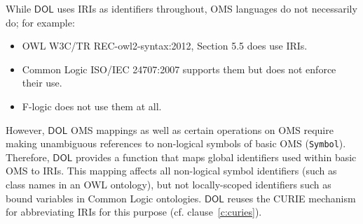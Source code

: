 \documentclass[10pt,fleqn,final]{scrreprt}
\makeatletter
\newcommand*{\cf}{cf.\@\xspace}
\newcommand*\CommentAuthor{}
\renewcommand*\CommentAuthor{#1}}
\newcommand*\CommentDate{}
\renewcommand*\CommentDate{#1}}
\newcommand*\CommentId{}
\renewcommand*\CommentId{#1}}
\newcommand*\CommentType{}
\renewcommand*\CommentType{#1}}
\newcommand*{\SetCommentColorByType}[1]{%
\edef\localType{{#1}}%
\expandafter\ifstrequal\localType{q-aut}{\colorlet{CommentColor}{red}}{%
\expandafter\ifstrequal\localType{q-all}{\colorlet{CommentColor}{orange}}{%
\expandafter\ifstrequal\localType{todo}{\colorlet{CommentColor}{orange}}{%
\expandafter\ifstrequal\localType{fyi}{\colorlet{CommentColor}{lightgray}}{%
\colorlet{CommentColor}{yellow}}}}}}
\newcommand*{\SetCommentPrefixByType}[1]{%
\edef\localType{{#1}}%
\expandafter\@ifmtarg\localType{%
\edef\CommentPrefix{}%
}{%
\caseupper[q]{#1}%
\edef\CommentPrefix{\thestring: }%
}}
\newcommand*{\initComment}[1]{%
\setkeys{Comment}{#1}%
\SetCommentColorByType{\CommentType}%
\relax%
\SetCommentPrefixByType{\CommentType}%
\relax%
}
\newcommand*{\todonote}[2][]{%
\initComment{#1}%
\pdfcomment[author=\CommentAuthor,color=CommentColor,date=\CommentDate,id=\CommentId]{%
\CommentPrefix
#2}}
\renewcommand*{\todonote}[2][]{%
\initComment{#1}%
\ednote{\CommentPrefix #2}}
\newcommand*{\CLnote}[2][author=Christoph Lange]{%
\todonote[author=Christoph Lange,#1]{#2} 
}
\newcommand*{\syntax}[1]{\texttt{#1}}
\newcommand*{\DOL}{\ensuremath{\mathsf{DOL}}\xspace}
\newcommand{\clauserefname}{clause}
\newcommand{\cref}[1]{\clauserefname~\ref{#1}}
\newcommand{\nisref}[1]{#1}
\newenvironment{definitions}[0]{\medskip }{}
\makeatother
\begin{document}
\begin{definitions}
While \DOL uses IRIs as identifiers throughout, OMS languages do not necessarily do; for example:
\begin{itemize}
\item OWL \nisref{W3C/TR REC-owl2-syntax:2012, Section 5.5} does use IRIs.
\item Common Logic \nisref{ISO/IEC 24707:2007} supports them but does not enforce their use.
\item F-logic \cite{flogic} does not use them at all.
\end{itemize}
However, \DOL OMS mappings as well as 
certain operations on OMS require making unambiguous references to non-logical symbols of basic OMS (\syntax{Symbol}).  Therefore, \DOL provides a function that maps global identifiers used within basic OMS to IRIs.  This mapping affects all non-logical symbol identifiers (such as class names in an OWL ontology), but not locally-scoped identifiers such as bound variables in Common Logic ontologies.  \DOL reuses the CURIE mechanism for abbreviating IRIs for this purpose (\cf \cref{c:curies}).


\end{definitions}
\end{document}
